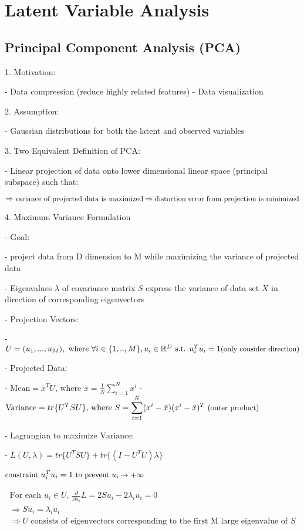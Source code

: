 \section{Latent Variable Analysis}

\subsection{Principal Component Analysis (PCA)}

1. Motivation:

- Data compression (reduce highly related features)
- Data visualization

2. Assumption:

- Gaussian distributions for both the latent and observed variables

3. Two Equivalent Definition of PCA:

- Linear projection of data onto lower dimensional linear space (principal subspace) such that: 

$\Rightarrow \text{variance of projected data is maximized} \\ \Rightarrow \text{distortion error from projection is minimized} $ 

4. Maximum Variance Formulation

- Goal: 

- project data from D dimension to M while maximizing the variance of projected data

- Eigenvalues $\lambda$ of covariance matrix $S$ express the variance of data set $X$ in direction of corresponding eigenvectors

- Projection Vectors: 

- $U = (u_1,...,u_M), \text{ where } \forall i\in\{1,..,M\},u_i \in \mathbb R^D \text{ s.t. } u_i^Tu_i=1 \space \small \text{(only consider direction)} $ 

- Projected Data:

- $\displaystyle \text{Mean} = {\bar x}^TU \text{, where } \bar x = \frac 1 N\sum_{i=1}^Nx^i$ 
- $\displaystyle \text{Variance} =  tr\{U^T S U\} \text{, where } S = \sum_{i=1}^N(x^i-\bar x)(x^i-\bar x)^T \space\small\text{ (outer product)}$ 

- Lagrangian to maximize $\text{Variance}$: 

- $\displaystyle L(U,\lambda)=tr\{U^TSU\}+tr\{(I-U^TU)\lambda\}$ 

	$\small\text{constraint }u_i^Tu_i=1 \text{ to prevent $u_i \rightarrow +\infty$ } $ 

\begin{gather}\text{For each $u_i\in U$, } \displaystyle \frac \partial {\partial u_i}L = 2Su_i-2\lambda_iu_i=0 \\ \Rightarrow Su_i=\lambda_iu_i \\ \Rightarrow \text{$U$ consists of eigenvectors corresponding to the first M large eigenvalue of $S$}\end{gather}

